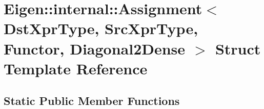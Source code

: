 \hypertarget{struct_eigen_1_1internal_1_1_assignment_3_01_dst_xpr_type_00_01_src_xpr_type_00_01_functor_00_01_diagonal2_dense_01_4}{}\section{Eigen\+:\+:internal\+:\+:Assignment$<$ Dst\+Xpr\+Type, Src\+Xpr\+Type, Functor, Diagonal2\+Dense $>$ Struct Template Reference}
\label{struct_eigen_1_1internal_1_1_assignment_3_01_dst_xpr_type_00_01_src_xpr_type_00_01_functor_00_01_diagonal2_dense_01_4}
\subsection*{Static Public Member Functions}

